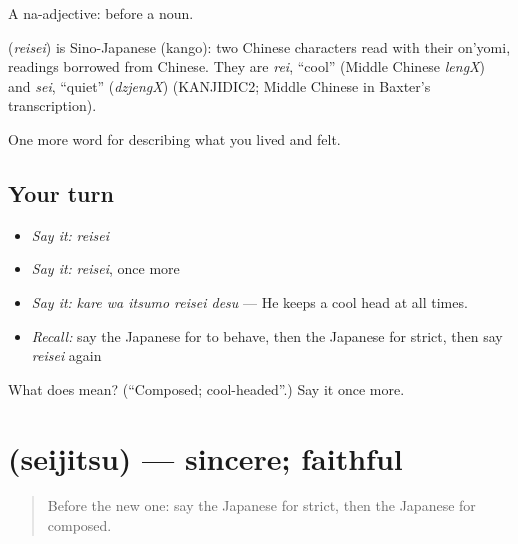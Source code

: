 A na-adjective:  before a noun.

\begin{cousinweb}
\textbf{} (\emph{reisei}) is Sino-Japanese (kango): two Chinese characters read with their on'yomi, readings borrowed from Chinese. They are \emph{rei}, \textquotedblleft{}cool\textquotedblright{} (Middle Chinese \emph{lengX}) and \emph{sei}, \textquotedblleft{}quiet\textquotedblright{} (\emph{dzjengX}) (KANJIDIC2; Middle Chinese in Baxter's transcription).
\end{cousinweb}

\begin{grammarlens}[title={What you've built}]
One more word for describing what you lived and felt.
\end{grammarlens}

\subsection*{Your turn}
\begin{itemize}
\raggedright
  \item \emph{Say it:} \emph{reisei}
  \item \emph{Say it:} \emph{reisei}, once more
  \item \emph{Say it:} \emph{kare wa itsumo reisei desu} — He keeps a cool head at all times.
  \item \emph{Recall:} say the Japanese for to behave, then the Japanese for strict, then say \emph{reisei} again
\end{itemize}

\begin{tcolorbox}[breakable,colback=teal!4,colframe=teal!35!black,title={Before you move on}]
What does  mean? (\textquotedblleft{}Composed; cool-headed\textquotedblright{}.) Say it once more.
\end{tcolorbox}
\section[\texorpdfstring{\ja{せいじつ} (seijitsu)}{せいじつ (seijitsu)}]{ (seijitsu) — sincere; faithful}

\label{lesson:JA-C437-seijitsu}



\begin{quote}
Before the new one: say the Japanese for strict, then the Japanese for composed.
\end{quote}

